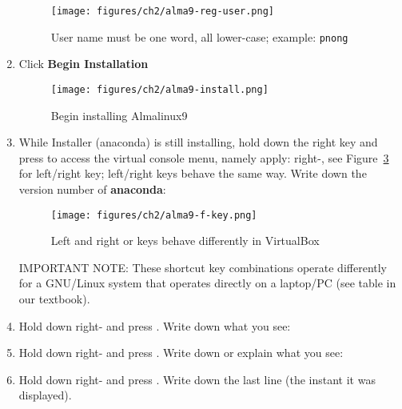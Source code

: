\begin{enumerate}
\begin{figure}[hbt!]\centering
   \texttt{[image: figures/ch2/alma9-reg-user.png]}
   \caption{User name must be one word, all lower-case; example: {\tt{pnong}}} \label{fig:alma9-user-pwd} %
\end{figure}

\item Click {\bf{Begin Installation}}

\begin{figure}[hbt!]\centering
   \texttt{[image: figures/ch2/alma9-install.png]}
   \caption{Begin installing Almalinux9} \label{fig:alma9-install} %
\end{figure}

\item {\label{start:l2.3}} While Installer (anaconda) is still installing, hold down the right {} key and press {} to access the virtual console menu, namely apply: right-{}, see Figure~\ref{fig:vbox-key} for left/right {} key; left/right {} keys behave the same way. Write down the version number of {\bf{anaconda}}: 

\begin{figure}[hbt!]\centering
   \texttt{[image: figures/ch2/alma9-f-key.png]}
   \caption{Left and right {} or {} keys behave differently in VirtualBox} \label{fig:vbox-key} %
\end{figure}

\vspace{0.15in} 
IMPORTANT NOTE: These shortcut key combinations operate differently for a GNU/Linux system that operates directly on a laptop/PC (see table in our textbook).

\item Hold down right-{} and press {}. Write down what you see:

\vspace{0.35in}

\item Hold down right-{} and press {}. Write down or explain what you see:

\vspace{0.50in}

\item Hold down right-{} and press {}. Write down the last line (the instant it was displayed). 


\end{enumerate}

